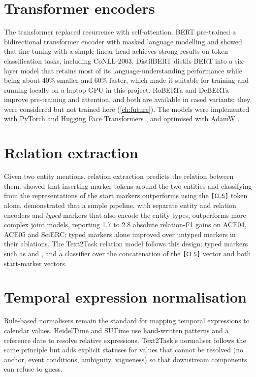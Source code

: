 \section{Transformer encoders}
The transformer \citep{vaswani2017attention} replaced recurrence with self-attention. BERT \citep{devlin2019bert} pre-trained a bidirectional transformer encoder with masked language modelling and showed that fine-tuning with a simple linear head achieves strong results on token-classification tasks, including CoNLL-2003. DistilBERT \citep{sanh2019distilbert} distils BERT into a six-layer model that retains most of its language-understanding performance while being about 40\% smaller and 60\% faster, which made it suitable for training and running locally on a laptop GPU in this project. RoBERTa \citep{liu2019roberta} and DeBERTa \citep{he2021deberta} improve pre-training and attention, and both are available in cased variants; they were considered but not trained here (\cref{ch:future}). The models were implemented with PyTorch \citep{paszke2019pytorch} and Hugging Face Transformers \citep{wolf2020transformers}, and optimised with AdamW \citep{loshchilov2019adamw}.

\section{Relation extraction}
Given two entity mentions, relation extraction predicts the relation between them. \citet{baldinisoares2019mtb} showed that inserting marker tokens around the two entities and classifying from the representations of the start markers outperforms using the \texttt{[CLS]} token alone. \citet{zhong2021pure} demonstrated that a simple pipeline, with separate entity and relation encoders and \emph{typed} markers that also encode the entity types, outperforms more complex joint models, reporting 1.7 to 2.8 absolute relation-F1 gains on ACE04, ACE05 and SciERC; typed markers alone improved over untyped markers in their ablations. The Text2Task relation model follows this design: typed markers such as \code{[E1\_TASK]} and \code{[E2\_TEMPORAL]}, and a classifier over the concatenation of the \texttt{[CLS]} vector and both start-marker vectors.

\section{Temporal expression normalisation}
Rule-based normalisers remain the standard for mapping temporal expressions to calendar values. HeidelTime \citep{strotgen2010heideltime} and SUTime \citep{chang2012sutime} use hand-written patterns and a reference date to resolve relative expressions. Text2Task's normaliser follows the same principle but adds explicit statuses for values that cannot be resolved (no anchor, event conditions, ambiguity, vagueness) so that downstream components can refuse to guess.

